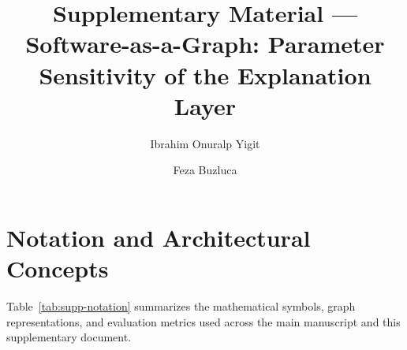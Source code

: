 \documentclass[preprint,3p]{elsarticle}
\begin{document}
\begin{frontmatter}
\title{Supplementary Material --- Software-as-a-Graph: Parameter Sensitivity of the Explanation Layer}
\author[itu,havelsan]{Ibrahim Onuralp Yigit}
\author[itu]{Feza Buzluca}
\end{frontmatter}

\section{Notation and Architectural Concepts}
\label{supp:notation}

Table~\ref{tab:supp-notation} summarizes the mathematical symbols, graph representations, and evaluation metrics used across the main manuscript and this supplementary document.
\end{document}
